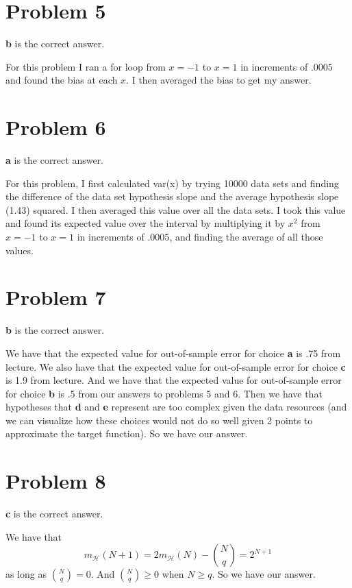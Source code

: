 \documentclass{article}
\begin{document}
\section*{Problem 5}
\textbf{b} is the correct answer.

\noindent For this problem I ran a for loop from $x=-1$ to $x=1$ in increments of
$.0005$ and found the bias at each $x$. I then averaged the bias to get my answer.

\section*{Problem 6}
\textbf{a} is the correct answer.

\noindent For this problem, I first calculated var(x) by trying 10000
data sets and finding the difference of the data set hypothesis slope and the
average hypothesis slope (1.43) squared. I then averaged this value over all the
data sets.  I took this value and found its expected value over the interval by
multiplying it by $x^2$ from $x=-1$ to $x=1$ in increments of $.0005$, and finding
the average of all those values.

\section*{Problem 7}
\textbf{b} is the correct answer.

\noindent We have that the expected value for out-of-sample error for
choice \textbf{a} is .75 from lecture. We also have that the expected value for
out-of-sample
error for choice \textbf{c} is 1.9 from lecture. And we have that the
expected value for out-of-sample error for choice \textbf{b} is .5 from
our answers to problems 5 and 6. Then we have that hypotheses that \textbf{d}
and \textbf{e} represent are too complex given the data resources (and
we can visualize how these choices would not do so well given 2 points to
approximate the target function). So we have our answer.

\section*{Problem 8}
\textbf{c} is the correct answer.

\noindent We have that
\[ m_{\mathcal{H}}(N+1) = 2m_{\mathcal{H}}(N) - \binom{N}{q} = 2^{N+1} \]
as long as $\binom{N}{q} = 0$. And $\binom{N}{q} \geq 0$ when $N \geq q$. So
we have our answer.
\end{document}
